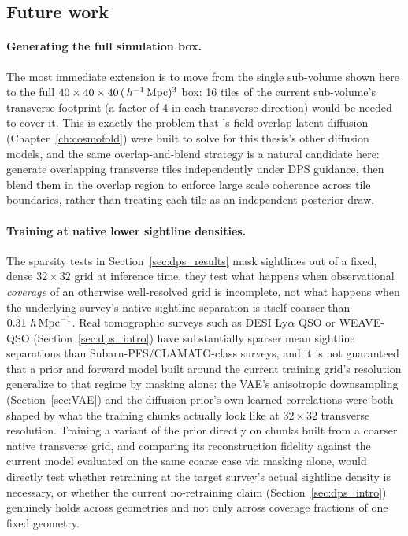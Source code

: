 \subsection{Future work}
\label{sec:dps_disc_future}

\paragraph{Generating the full simulation box.} The most immediate extension is to move from the single sub-volume shown here to the full $40\times40\times40\,(\,h^{-1}\,\mathrm{Mpc})^3$ box: 16 tiles of the current sub-volume's transverse footprint (a factor of 4 in each transverse direction) would be needed to cover it. This is exactly the problem that \FOLD's field-overlap latent diffusion (Chapter~\ref{ch:cosmofold}) were built to solve for this thesis's other diffusion models, and the same overlap-and-blend strategy is a natural candidate here: generate overlapping transverse tiles independently under DPS guidance, then blend them in the overlap region to enforce large scale coherence across tile boundaries, rather than treating each tile as an independent posterior draw. 

\paragraph{Training at native lower sightline densities.} The sparsity tests in Section~\ref{sec:dps_results} mask sightlines out of a fixed, dense $32\times32$ grid at inference time, they test what happens when observational \emph{coverage} of an otherwise well-resolved grid is incomplete, not what happens when the underlying survey's native sightline separation is itself coarser than $0.31\,\,h\,\mathrm{Mpc}^{-1}$. Real tomographic surveys such as DESI Ly$\alpha$ QSO or WEAVE-QSO (Section~\ref{sec:dps_intro}) have substantially sparser mean sightline separations than Subaru-PFS/CLAMATO-class surveys, and it is not guaranteed that a prior and forward model built around the current training grid's resolution generalize to that regime by masking alone: the VAE's anisotropic downsampling (Section~\ref{sec:VAE}) and the diffusion prior's own learned correlations were both shaped by what the training chunks actually look like at $32\times32$ transverse resolution. Training a variant of the prior directly on chunks built from a coarser native transverse grid, and comparing its reconstruction fidelity against the current model evaluated on the same coarse case via masking alone, would directly test whether retraining at the target survey's actual sightline density is necessary, or whether the current no-retraining claim (Section~\ref{sec:dps_intro}) genuinely holds across geometries and not only across coverage fractions of one fixed geometry.

